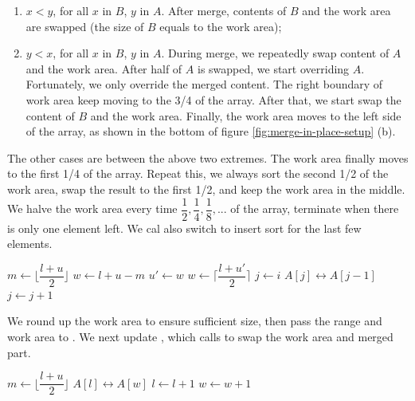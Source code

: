 \documentclass[b5paper]{article}
\begin{document}
\begin{enumerate}
\item $x < y$, for all $x$ in $B$, $y$ in $A$. After merge, contents of $B$ and the work area are swapped (the size of $B$ equals to the work area);
\item $y < x$, for all $x$ in $B$, $y$ in $A$. During merge, we repeatedly swap content of $A$ and the work area. After half of $A$ is swapped, we start overriding $A$. Fortunately, we only override the merged content. The right boundary of work area keep moving to the 3/4 of the array. After that, we start swap the content of $B$ and the work area. Finally, the work area moves to the left side of the array, as shown in the bottom of figure \cref{fig:merge-in-place-setup} (b).
\end{enumerate}

The other cases are between the above two extremes. The work area finally moves to the first 1/4 of the array. Repeat this, we always sort the second 1/2 of the work area, swap the result to the first 1/2, and keep the work area in the middle. We halve the work area every time $\dfrac{1}{2}, \dfrac{1}{4}, \dfrac{1}{8}, ...$ of the array, terminate when there is only one element left. We cal also switch to insert sort for the last few elements.

\begin{algorithmic}[1]
    \State $m \gets \lfloor \dfrac{l + u}{2} \rfloor$
    \State $w \gets l + u - m$
    \State {} 
      \State $u' \gets w$
      \State $w \gets \lceil \dfrac{l + u'}{2} \rceil$ 
      \State {} 
      \State {}
    \EndWhile
     
      \State $j \gets i$
        \State {} $A[j] \leftrightarrow A[j-1]$
        \State $j \gets j + 1$
      \EndWhile
    \EndFor
  \EndIf
\EndProcedure
\end{algorithmic}

We round up the work area to ensure sufficient size, then pass the range and work area to . We next update , which calls  to swap the work area and merged part.

\begin{algorithmic}[1]
    \State $m \gets \lfloor \dfrac{l + u}{2} \rfloor$
    \State {}
    \State {}
    \State \Call{Merge}{$A, [l, m), [m+1, u), w$}
  \Else {}
      \State {} $A[l] \leftrightarrow A[w]$
      \State $l \gets l + 1$
      \State $w \gets w + 1$
    \EndWhile
  \EndIf
\EndProcedure
\end{algorithmic}
\end{document}
